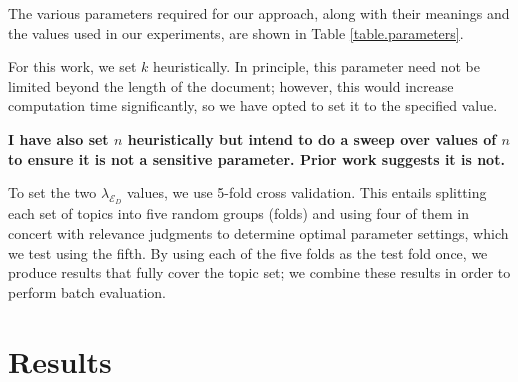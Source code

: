 \documentclass{article}
\begin{document}
The various parameters required for our approach, along with their meanings and the values used in our experiments, are shown in Table \ref{table.parameters}. 


For this work, we set $k$ heuristically. In principle, this parameter need not be limited beyond the length of the document; however, this would increase computation time significantly, so we have opted to set it to the specified value.

\textbf{I have also set $n$ heuristically but intend to do a sweep over values of $n$ to ensure it is not a sensitive parameter. Prior work suggests it is not.}


To set the two $\lambda_{\mathcal{E}_D}$ values, we use 5-fold cross validation. This entails splitting each set of topics into five random groups (folds) and using four of them in concert with relevance judgments to determine optimal parameter settings, which we test using the fifth. By using each of the five folds as the test fold once, we produce results that fully cover the topic set; we combine these results in order to perform batch evaluation. 

\section{Results}\label{section.results}
\end{document}
